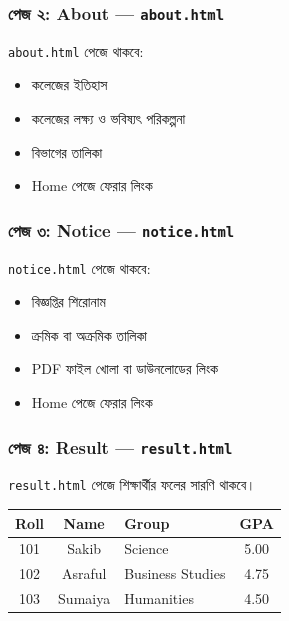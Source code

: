 \par\noindent
\begin{minipage}[t]{.48\linewidth}\vspace{0pt}
\subsubsection{পেজ ২: About — \texttt{about.html}}

\texttt{about.html} পেজে থাকবে:
\begin{itemize}
\item কলেজের ইতিহাস
\item কলেজের লক্ষ্য ও ভবিষ্যৎ পরিকল্পনা
\item বিভাগের তালিকা
\item Home পেজে ফেরার লিংক
\end{itemize}
\end{minipage}\hfill
\begin{minipage}[t]{.48\linewidth}\vspace{0pt}
\subsubsection{পেজ ৩: Notice — \texttt{notice.html}}

\texttt{notice.html} পেজে থাকবে:
\begin{itemize}
\item বিজ্ঞপ্তির শিরোনাম
\item ক্রমিক বা অক্রমিক তালিকা
\item PDF ফাইল খোলা বা ডাউনলোডের লিংক
\item Home পেজে ফেরার লিংক
\end{itemize}
\end{minipage}\par\smallskip
\subsubsection{পেজ ৪: Result — \texttt{result.html}}

\texttt{result.html} পেজে শিক্ষার্থীর ফলের সারণি থাকবে।

\begin{center}
\begin{tabular}{|c|c|p{}|c|}
\hline
\textbf{Roll} & \textbf{Name} & \textbf{Group} & \textbf{GPA} \\
\hline
101 & Sakib & Science & 5.00 \\
\hline
102 & Asraful & Business Studies & 4.75 \\
\hline
103 & Sumaiya & Humanities & 4.50 \\
\hline
\end{tabular}
\end{center}

